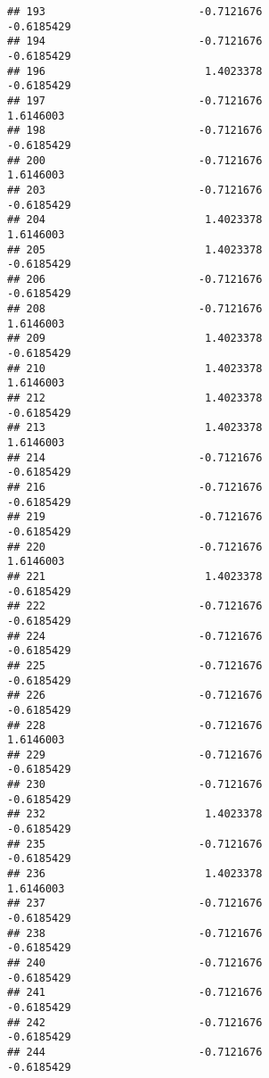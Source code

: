 \documentclass[
]{article}
\begin{document}
\begin{verbatim}
## 193                        -0.7121676                       -0.6185429
## 194                        -0.7121676                       -0.6185429
## 196                         1.4023378                       -0.6185429
## 197                        -0.7121676                        1.6146003
## 198                        -0.7121676                       -0.6185429
## 200                        -0.7121676                        1.6146003
## 203                        -0.7121676                       -0.6185429
## 204                         1.4023378                        1.6146003
## 205                         1.4023378                       -0.6185429
## 206                        -0.7121676                       -0.6185429
## 208                        -0.7121676                        1.6146003
## 209                         1.4023378                       -0.6185429
## 210                         1.4023378                        1.6146003
## 212                         1.4023378                       -0.6185429
## 213                         1.4023378                        1.6146003
## 214                        -0.7121676                       -0.6185429
## 216                        -0.7121676                       -0.6185429
## 219                        -0.7121676                       -0.6185429
## 220                        -0.7121676                        1.6146003
## 221                         1.4023378                       -0.6185429
## 222                        -0.7121676                       -0.6185429
## 224                        -0.7121676                       -0.6185429
## 225                        -0.7121676                       -0.6185429
## 226                        -0.7121676                       -0.6185429
## 228                        -0.7121676                        1.6146003
## 229                        -0.7121676                       -0.6185429
## 230                        -0.7121676                       -0.6185429
## 232                         1.4023378                       -0.6185429
## 235                        -0.7121676                       -0.6185429
## 236                         1.4023378                        1.6146003
## 237                        -0.7121676                       -0.6185429
## 238                        -0.7121676                       -0.6185429
## 240                        -0.7121676                       -0.6185429
## 241                        -0.7121676                       -0.6185429
## 242                        -0.7121676                       -0.6185429
## 244                        -0.7121676                       -0.6185429

\end{verbatim}
\end{document}

